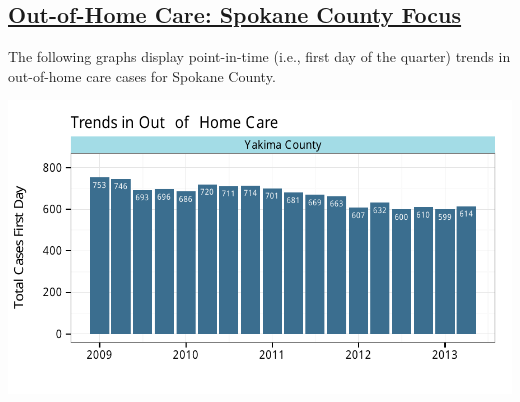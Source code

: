 \documentclass{article}\usepackage[]{graphicx}\usepackage[]{color}
\makeatletter
\def\maxwidth{ %
  \ifdim\Gin@nat@width>\linewidth
    \linewidth
  \else
    \Gin@nat@width
  \fi
}
\newenvironment{knitrout}{}{} %
\makeatother
\begin{document}
\begin{minipage}{\textwidth}
\subsection{\href{http://www.partnersforourchildren.org/child-well-being/visualizations/out-home-care/trends}
 {Out-of-Home Care: Spokane County Focus}
}
The following graphs display point-in-time (i.e., first day of the quarter) trends in out-of-home care cases for
Spokane County.\\[1pt]
\begin{knitrout}
\color{fgcolor}

{\centering \includegraphics[width=\maxwidth]{figure/ooh_focus} 

}



\end{knitrout}

\end{minipage}
\end{document}
